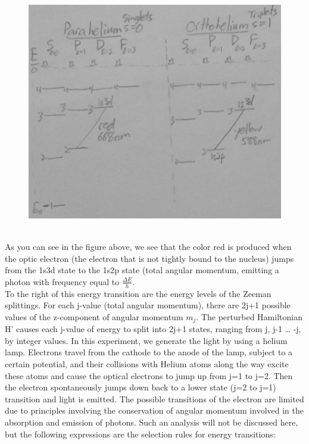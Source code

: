 \documentclass{article}
\begin{document}
    \begin{figure}[H]
    \centering
    \includegraphics[scale = 0.2]{ATM1c.jpg}
    \caption{}
    \label{fig:my_label}
\end{figure}\\
    As you can see in the figure above, we see that the color red is produced when the optic electron (the electron that is not tightly bound to the nucleus) jumps from the 1s3d state to the 1s2p state (total angular momentum, emitting a photon with frequency equal to $\frac{\Delta E}{h}$. \\ To the right of this energy transition are the energy levels of the Zeeman splittings. For each j-value (total angular momentum), there are 2j+1 possible values of the z-component of angular momentum $m_j$. The perturbed Hamiltonian H’ causes each j-value of energy to split into 2j+1 states, ranging from j, j-1 … -j, by integer values. 
    In this experiment, we generate the light by using a helium lamp. Electrons travel from the cathode to the anode of the lamp, subject to a certain potential,  and their collisions with Helium atoms along the way excite these atoms and cause the optical electrons to jump up from j=1 to j=2. Then the electron spontaneously jumps down back to a lower state (j=2 to j=1) transition and light is emitted. The possible transitions of the electron are limited due to principles involving the conservation of angular momentum involved in the absorption and emission of photons. Such an analysis will not be discussed here, but the following expressions are the selection rules for energy transitions:
\end{document}
